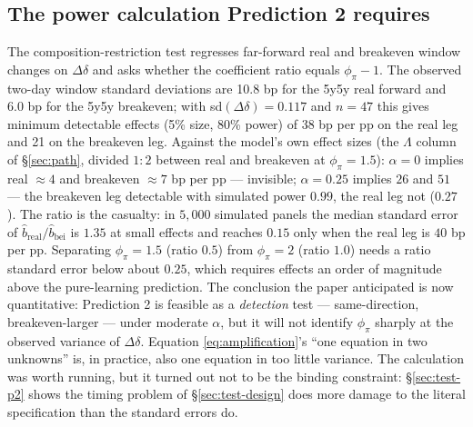 \documentclass[11pt]{article}
\begin{document}
\subsection{The power calculation Prediction 2 requires}
\label{sec:test-power}
The composition-restriction test regresses far-forward real and breakeven
window changes on $\Delta\delta$ and asks whether the coefficient ratio equals
$\phi_\pi-1$. The observed two-day window standard deviations are 10.8 bp for
the 5y5y real forward and 6.0 bp for the 5y5y breakeven; with
sd$(\Delta\delta)=0.117$ and $n=47$ this gives minimum detectable effects
(5\% size, 80\% power) of 38 bp per pp on the real leg and 21 on the breakeven
leg. Against the model's own effect sizes (the $\Lambda$ column of
\S\ref{sec:path}, divided $1{:}2$ between real and breakeven at
$\phi_\pi=1.5$): $\alpha=0$ implies real $\approx4$ and breakeven $\approx7$ bp
per pp --- invisible; $\alpha=0.25$ implies $26$ and $51$ --- the breakeven leg
detectable with simulated power $0.99$, the real leg not ($0.27$). The ratio is
the casualty: in $5{,}000$ simulated panels the median standard error of
$\hat b_{\text{real}}/\hat b_{\text{bei}}$ is $1.35$ at small effects and
reaches $0.15$ only when the real leg is $40$ bp per pp. Separating
$\phi_\pi=1.5$ (ratio $0.5$) from $\phi_\pi=2$ (ratio $1.0$) needs a ratio
standard error below about $0.25$, which requires effects an order of magnitude
above the pure-learning prediction.
The conclusion the paper anticipated is now quantitative: Prediction 2 is
feasible as a \emph{detection} test --- same-direction, breakeven-larger ---
under moderate $\alpha$, but it will not identify $\phi_\pi$ sharply at the
observed variance of $\Delta\delta$. Equation \eqref{eq:amplification}'s ``one
equation in two unknowns'' is, in practice, also one equation in too little
variance. The calculation was worth running, but it turned out not to be the
binding constraint: \S\ref{sec:test-p2} shows the timing problem of
\S\ref{sec:test-design} does more damage to the literal specification than the
standard errors do.
\end{document}
